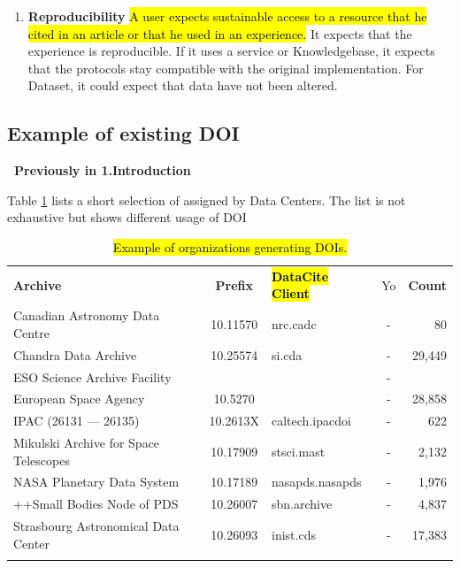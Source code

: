 \documentclass[11pt,a4paper]{ivoa}
\begin{document}
\begin{enumerate}
	\item \textbf{Reproducibility} 
	\hl{A user expects sustainable access to a resource that he cited in an article or that he used in an experience.}
	It expects that the experience is reproducible. If it uses a service or Knowledgebase, it expects that the protocols stay compatible with the original implementation. For Dataset, it could expect that data have not been altered. 
	
	
  
\end{enumerate}

\subsection{Example of existing DOI}
\textbf{\color{red} Previously in 1.Introduction}

Table \ref{tab:astroDOIs1} lists a short selection of assigned by Data Centers. The list is not exhaustive but shows different usage of DOI  


\begin{table}[th]
\begin{tabular}{lclcr}
\sptablerule
\textbf{Archive} & \textbf{Prefix} & \hl{\textbf{DataCite Client}} & Yo & \textbf{Count} \\
\sptablerule
Canadian Astronomy Data Centre        & 10.11570 & nrc.cadc        & - &     80   \\
Chandra Data Archive                  & 10.25574 & si.cda          & - & 29,449   \\
ESO Science Archive Facility          &          &                 & - &          \\
European Space Agency                 & 10.5270  &                 & - & 28,858   \\
IPAC (26131 --- 26135)                & 10.2613X & caltech.ipacdoi & - &    622   \\
Mikulski Archive for Space Telescopes & 10.17909 & stsci.mast      & - &  2,132   \\
NASA Planetary Data System            & 10.17189 & nasapds.nasapds & - &  1,976   \\
++Small Bodies Node of PDS            & 10.26007 & sbn.archive     & - &  4,837   \\
Strasbourg Astronomical Data Center   & 10.26093 & inist.cds       & - & 17,383   \\
\sptablerule
\end{tabular}%
\caption{\label{tab:astroDOIs1} \hl{Example of organizations generating DOIs.}}
\end{table}
\end{document}
